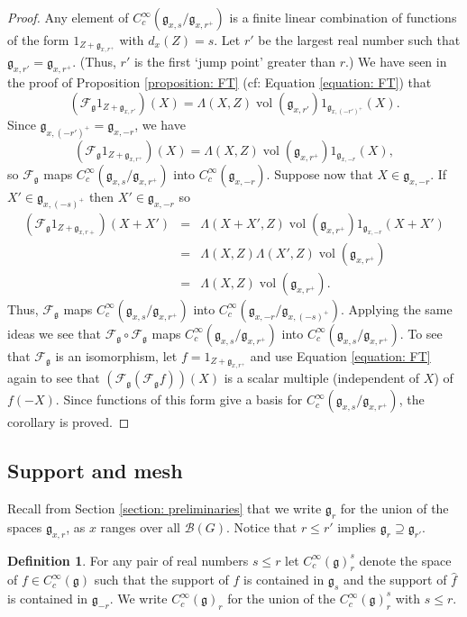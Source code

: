 \documentclass[11pt]{amsart}
\theoremstyle{definition}
\newtheorem{definition}[theorem]{Definition}
\theoremstyle{remark}
\numberwithin{equation}{theorem}
\def\GF{{G}}
\def\gF{{\mathfrak{g}}}
\def\kill#1#2{{\Lambda\left({#1},{#2}\right)}}
\def\B{{\mathcal{B}}}
\def\Fourier{{\mathcal{F}}}
\def\Sch#1{{C^\infty_c(#1)}}
\def\rightcoset{{ / }}
\def\vol{{\operatorname{vol}}}
\def\vol{\operatorname{vol}}
\begin{document}
\begin{proof}
Any element of $\Sch{\gF_{x,s}\rightcoset\gF_{x,r^+}}$ is a finite
linear combination of functions of the form $1_{Z+\gF_{x,r^+}}$
with $d_x(Z) = s$. Let $r'$ be the largest real number such that
$\gF_{x,r'} = \gF_{x,r^+}$. (Thus, $r'$ is the first `jump point'
greater than $r$.) We have seen in the proof of Proposition
\ref{proposition: FT} (cf: Equation \ref{equation: FT}) that
\[
(\Fourier_\gF 1_{Z+\gF_{x,r'}})(X) = \kill{X}{Z} \vol(\gF_{x,r'})
1_{\gF_{x,(-r')^+}}(X).
\]
Since $\gF_{x,(-r')^+} = \gF_{x,-r}$, we have
\[
(\Fourier_\gF 1_{Z+\gF_{x,r^+}})(X) = \kill{X}{Z}
\vol(\gF_{x,r^+}) 1_{\gF_{x,-r}}(X),
\]
so $\Fourier_\gF$ maps $\Sch{\gF_{x,s}\rightcoset\gF_{x,r^+}}$
into $\Sch{\gF_{x,-r}}$. Suppose now that $X\in \gF_{x,-r}$. If
$X' \in \gF_{x,(-s)^+}$ then $X'\in \gF_{x,-r}$ so
\begin{eqnarray*}
(\Fourier_\gF 1_{Z+\gF_{x,r+}})(X+X')
 &=& \kill{X+X'}{Z}\vol(\gF_{x,r^+}) 1_{\gF_{x,-r}}(X+X')\\
 &=& \kill{X}{Z}\kill{X'}{Z}\vol(\gF_{x,r^+})\\
 &=& \kill{X}{Z}\vol(\gF_{x,r^+}).
\end{eqnarray*}
Thus, $\Fourier_\gF$ maps $\Sch{\gF_{x,s}\rightcoset\gF_{x,r^+}}$
into $\Sch{\gF_{x,-r}/\gF_{x,(-s)^+}}$. Applying the same ideas we
see that $\Fourier_\gF\circ \Fourier_\gF$ maps
$\Sch{\gF_{x,s}\rightcoset\gF_{x,r^+}}$ into
$\Sch{\gF_{x,s}\rightcoset\gF_{x,r^+}}$. To see that $\Fourier_\gF$
is an isomorphism, let $f = 1_{Z+\gF_{x,r^+}}$ and use Equation
\ref{equation: FT} again to see that $(\Fourier_\gF(\Fourier_\gF
f))(X)$ is a scalar multiple (independent of $X$) of $f(-X)$. Since
functions of this form give a basis for
$\Sch{\gF_{x,s}\rightcoset\gF_{x,r^+}}$, the corollary is proved.
\end{proof}


\subsection{Support and mesh}

Recall from Section \ref{section: preliminaries} that we write
$\gF_{r}$ for the union of the spaces $\gF_{x,r}$, as $x$ ranges
over all $\B(\GF)$. Notice that $r\leq r'$ implies $\gF_r
\supseteq \gF_{r'}$.

\begin{definition}\label{definition: depth r Hecke} For any pair
of real numbers $s\leq r$ let $\Sch{\gF}^s_r$ denote the space of
$f\in\Sch{\gF}$ such that the support of $f$ is contained in
$\gF_s$ and the support of $\widehat{f}$ is contained in
$\gF_{-r}$.
We write $\Sch{\gF}_r$ for the union of the $\Sch{\gF}_r^s$ with $s\leq r$.
\end{definition}
\end{document}
